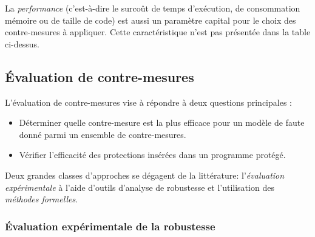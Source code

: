             La \textit{performance} (c'est-à-dire le surcoût de temps d'exécution, de consommation mémoire ou de taille de code) est aussi un paramètre capital pour le choix des contre-mesures à appliquer. Cette caractéristique n'est pas présentée dans la table ci-dessus.

        \subsection{Évaluation de contre-mesures}
        \label{sec:cm-analysis}
    
            L'évaluation de contre-mesures vise à répondre à deux questions principales :
            \begin{itemize}
                \item Déterminer quelle contre-mesure est la plus efficace pour un modèle de faute donné parmi un ensemble de contre-mesures.
                \item Vérifier l'efficacité des protections insérées dans un programme protégé.
            \end{itemize}
        
            Deux grandes classes d'approches se dégagent de la littérature: l'\textit{évaluation expérimentale} à l'aide d'outils d'analyse de robustesse et l'utilisation des \textit{méthodes formelles}.
    
            \subsubsection{Évaluation expérimentale de la robustesse}
            
